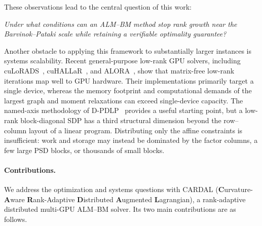 \documentclass[11pt]{article}
\theoremstyle{definition}
\theoremstyle{remark}
\newcommand{\name}{\textsc{CARDAL}\xspace}
\newcommand{\nameexpand}{\textbf{C}urvature-\textbf{A}ware \textbf{R}ank-Adaptive
  \textbf{D}istributed \textbf{A}ugmented \textbf{L}agrangian}
\begin{document}
These observations lead to the central question of this work:
\begin{center}
\emph{Under what conditions can an ALM--BM method stop rank growth near the Barvinok--Pataki scale while retaining a verifiable optimality guarantee?}
\end{center}

Another obstacle to applying this framework to substantially larger instances
is systems scalability.  Recent general-purpose low-rank GPU solvers,
including cuLoRADS~\cite{LoRADS,cuLoRADS}, cuHALLaR~\cite{cuHALLaR}, and
ALORA~\cite{ALORA}, show that matrix-free low-rank iterations map well to GPU
hardware.  Their implementations primarily target a single device, whereas the
memory footprint and computational demands of the largest graph and moment
relaxations can exceed single-device capacity.  The named-axis methodology of
D-PDLP~\cite{DPDLP}
provides a useful starting point, but a low-rank block-diagonal SDP has a third
structural dimension beyond the row--column layout of a linear program.
Distributing only the affine constraints is insufficient: work and storage
may instead be dominated by the factor columns, a few large PSD blocks, or
thousands of small blocks.

\paragraph{Contributions.} We address the optimization and systems questions
with \name{} (\nameexpand), a rank-adaptive distributed multi-GPU ALM--BM
solver.  Its two main contributions are as follows.
\end{document}
